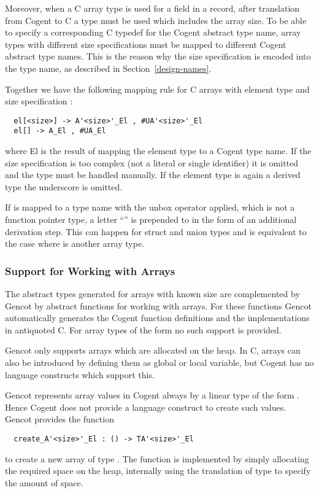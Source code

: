 Moreover, when a C array type is used for a field in a record, after translation from Cogent to C a type
must be used which includes the array size. To be able to specify a corresponding C typedef for the 
Cogent abstract type name, array types with different size specifications must be mapped to different 
Cogent abstract type names. This is the reason why the size specification is encoded into the type name,
as described in Section~\ref{design-names}. 

Together we have the following mapping rule for C arrays with element type  and size 
specification :
\begin{verbatim}
  el[<size>] -> A'<size>'_El , #UA'<size>'_El
  el[] -> A_El , #UA_El
\end{verbatim}
where El is the result of mapping the element type  to a Cogent type name. If the size specification
is too complex (not a literal or single identifier) it is omitted and the type must be handled manually. If the
element type is again a derived type the underscore is omitted.

If  is mapped to a type name with the unbox operator applied, which is not a function pointer type,
a letter ``'' is prepended to  in the form of an additional derivation step. This can happen for 
struct and union types and is equivalent to the case where  is another array type.

\subsubsection{Support for Working with Arrays}

The abstract types generated for arrays with known size are complemented by Gencot by abstract functions for working with
arrays. For these functions Gencot automatically generates the Cogent function definitions and the 
implementations in antiquoted C. For array types of the form  no such support is provided.

Gencot only supports arrays which are allocated on the heap. In C, arrays can also be introduced by defining
them as global or local variable, but Cogent has no language constructs which support this.

Gencot represents array values in Cogent always by a linear type of the form .
Hence Cogent does not provide a language construct to create such values. Gencot provides the function
\begin{verbatim}
  create_A'<size>'_El : () -> TA'<size>'_El
\end{verbatim}
to create a new array of type . The function is implemented by simply allocating the
required space on the heap, internally using the translation of type  to specify
the amount of space. 

